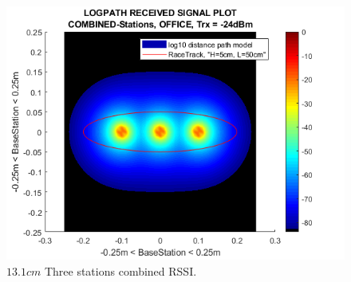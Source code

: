 \begin{figure}[H]
	\centering
	\includegraphics[width=\linewidth]{theory/pathLoss/fig/logpathReceivedSignal_combinedStations_office_lowSignal.png}
	\caption{$13.1cm$ Three stations combined RSSI.}
	\label{fig:logpathReceivedSignal_combinedStations_office_lowSignal}
\end{figure}